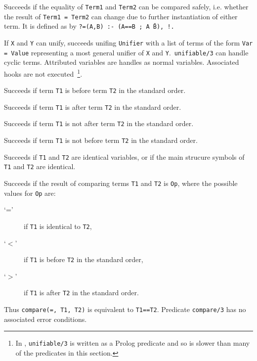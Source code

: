 \begin{description}
%
Succeeds if the equality of {\tt Term1} and {\tt Term2} can be
compared safely, i.e. whether the result of {\tt Term1 = Term2} can
change due to further instantiation of either term. It is defined as
by {\tt ?=(A,B) :- (A==B ; A \= B), !.} 

%
If {\tt X} and {\tt Y} can unify, succeeds unifing {\tt Unifier} with
a list of terms of the form {\tt Var = Value} representing a most
general unifier of {\tt X} and {\tt Y}.\  {\tt unifiable/3} can handle
cyclic terms. Attributed variables are handles as normal
variables. Associated hooks are not executed~\footnote{In \version ,
  {\tt unifiable/3} is written as a Prolog predicate and so is slower
  than many of the predicates in this section.}.

    Succeeds if term {\tt T1} is before term {\tt T2} in the standard order.

    Succeeds if term {\tt T1} is after term {\tt T2} in the standard order.

    Succeeds if term {\tt T1} is not after term {\tt T2} in the standard order.

    Succeeds if term {\tt T1} is not before term {\tt T2} in the standard order.

    Succeeds if {\tt T1} and {\tt T2} are identical variables, or if
    the main strucure symbols of {\tt T1} and {\tt T2} are identical.

    Succeeds if the result of comparing terms {\tt T1} and {\tt T2} 
    is {\tt Op}, where the possible values for {\tt Op} are:
    \begin{description}
    \item[`='] if {\tt T1} is identical to {\tt T2},
    \item[`$<$'] if {\tt T1} is before {\tt T2} in the standard order,
    \item[`$>$'] if {\tt T1} is after {\tt T2} in the standard order.
    \end{description}
    Thus {\tt compare(=, T1, T2)} is equivalent to {\tt T1==T2}.
    Predicate {\tt compare/3} has no associated error conditions.

\end{description}


